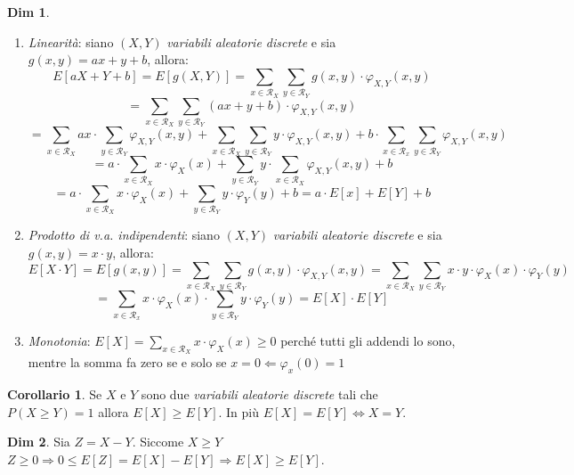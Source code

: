 \documentclass[12pt, a4paper]{report}
\theoremstyle{definition}
\newtheorem{corollary}{Corollario}[theorem]
\newtheorem*{demonstration}{Dim}
\DeclareRobustCommand{\supp}{\mathcal{R}}%
\begin{document}
\begin{demonstration}
	\mbox{}
	\begin{enumerate}[label=(\roman*)]
		\item \emph{Linearità}: siano $(X,Y)$ \emph{variabili aleatorie discrete}
		e sia \(g(x,y)=ax+y+b\), allora:
		\[E[aX+Y+b]=E[g(X,Y)]=\sum_{x\in\supp_X}\sum_{y\in\supp_Y}g(x,y)\cdot \varphi
		_{X,Y}(x,y)\]
		\[=\sum_{x\in\supp_X}\sum_{y\in\supp_Y}(ax+y+b)\cdot \varphi_{X,Y}(x,y)\]
		\[=\sum_{x\in\supp_X}ax\cdot \sum_{y\in\supp_Y}\varphi_{X,Y}(x,y)+\sum_{x\in\supp_X}
		\sum_{y\in\supp_Y}y\cdot \varphi_{X,Y}(x,y)+b\cdot \sum_{x\in\supp_x}\sum_{y\in\supp_Y}
		\varphi_{X,Y}(x,y)\]
		\[=a\cdot \sum_{x\in\supp_X}x\cdot \varphi_X(x)+\sum_{y\in\supp_Y}y\cdot \sum_{x\in\supp_X}
		\varphi_{X,Y}(x,y)+b\]
		\[=a\cdot \sum_{x\in\supp_X}x\cdot \varphi_X(x)+\sum_{y\in\supp_Y}y\cdot \varphi_Y(y)+b
		=a\cdot E[x]+E[Y]+b\]
		\item \emph{Prodotto di v.a. indipendenti}: siano $(X,Y)$
		\emph{variabili aleatorie discrete}	e sia \(g(x,y)=x\cdot y\), allora:
		\[E[X\cdot Y]=E[g(x,y)]=\sum_{x\in\supp_X}\sum_{y\in\supp_Y}g(x,y)\cdot \varphi_
		{X,Y}(x,y)=\sum_{x\in\supp_X}\sum_{y\in\supp_Y}x\cdot y\cdot \varphi_X(x)\cdot \varphi_Y(y)\]
		\[=\sum_{x\in\supp_x}x\cdot \varphi_X(x)\cdot \sum_{y\in\supp_Y}y\cdot \varphi_Y(y)=E[X]\cdot E[Y]\]
		\item \emph{Monotonia}: \(E[X]=\sum_{x\in\supp_X}x\cdot \varphi_X(x)\geq 0\)
		perché tutti gli addendi lo sono, mentre la somma fa zero se e solo se
		\(x=0\Leftarrow\varphi_x(0)=1\)
	\end{enumerate}
\end{demonstration}
\newpage

\begin{corollary}
	Se $X$ e $Y$ sono due \emph{variabili aleatorie discrete} tali che \(P(X\geq
	Y)=1\) allora \(E[X]\geq E[Y]\). In più \(E[X]=E[Y]\Leftrightarrow X=Y\).
\end{corollary}
\begin{demonstration}
	Sia $Z=X-Y$. Siccome $X\geq Y$ \(Z\geq 0\Rightarrow 0\leq E[Z]=E[X]-E[Y]
	\Rightarrow E[X]\geq E[Y]\).
\end{demonstration}
\end{document}
